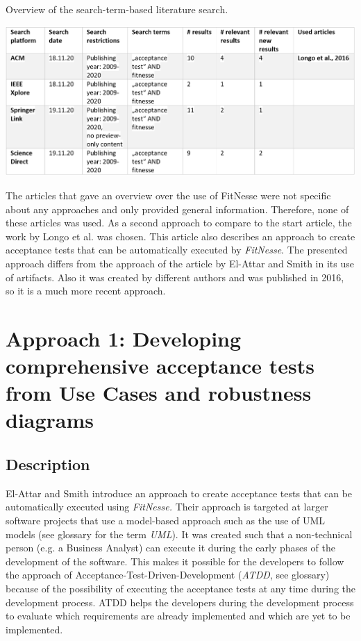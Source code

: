\begin{table}[H]
	\caption{Overview of the search-term-based literature search.}
	
	\includegraphics[width=\textwidth]{../images/LitSearchFitnesse.png} 
	
	\label{fig:lit-search-fitnesse}
\end{table}


The articles that gave an overview over the use of FitNesse were not specific about any approaches and only provided general information.
Therefore, none of these articles was used.
As a second approach to compare to the start article, the work by Longo et al. \cite{longo} was chosen.
This article also describes an approach to create acceptance tests that can be automatically executed by \textit{FitNesse}.
The presented approach differs from the approach of the article by El-Attar and Smith in its use of artifacts.
Also it was created by different authors and was published in 2016, so it is a much more recent approach.


\section{Approach 1: Developing comprehensive acceptance tests from Use Cases and robustness diagrams}
\label{sec:el-attar}

\subsection{Description}

El-Attar and Smith \cite{el-attar} introduce an approach to create acceptance tests that can be automatically executed using \textit{FitNesse.}
Their approach is targeted at larger software projects that use a model-based approach such as the use of UML models (see glossary for the term \textit{UML}). 
It was created such that a non-technical person (e.g. a Business Analyst) can execute it during the early phases of the development of the software.
This makes it possible for the developers to follow the approach of Acceptance-Test-Driven-Development (\textit{ATDD}, see glossary) because of the possibility of executing the acceptance tests at any time during the development process.
ATDD helps the developers during the development process to evaluate which requirements are already implemented and  which are yet to be implemented.

